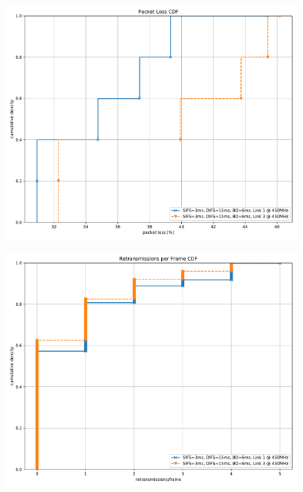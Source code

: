 \documentclass{article}
\begin{document}
\begin{figure}
	\includegraphics[width=\textwidth]{rb_dual/link_1_3/cdf/packet_loss_cdf}
\end{figure}

\begin{figure}
	\includegraphics[width=\textwidth]{rb_dual/link_1_3/cdf/retransmissions_per_frame_cdf}
\end{figure}
\end{document}
